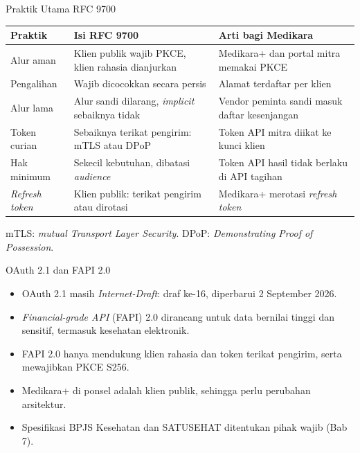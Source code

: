 \documentclass[aspectratio=169, table, 12pt]{beamer}
\begin{document}
\begin{frame}{{\Large Praktik Utama RFC 9700}}
  \footnotesize
  \begin{tabularx}{\textwidth}{>{\raggedright\arraybackslash}p{2.4cm}
      >{\raggedright\arraybackslash}X >{\raggedright\arraybackslash}X}
    \hline
    \textbf{Praktik} & \textbf{Isi RFC 9700} & \textbf{Arti bagi Medikara} \\ \hline
    Alur aman & Klien publik wajib PKCE, klien rahasia dianjurkan & Medikara+ dan portal mitra memakai PKCE \\ \hline
    Pengalihan & Wajib dicocokkan secara persis & Alamat terdaftar per klien \\ \hline
    Alur lama & Alur sandi dilarang, \textit{implicit} sebaiknya tidak & Vendor peminta sandi masuk daftar kesenjangan \\ \hline
    Token curian & Sebaiknya terikat pengirim: mTLS atau DPoP & Token API mitra diikat ke kunci klien \\ \hline
    Hak minimum & Sekecil kebutuhan, dibatasi \textit{audience} & Token API hasil tidak berlaku di API tagihan \\ \hline
    \textit{Refresh token} & Klien publik: terikat pengirim atau dirotasi & Medikara+ merotasi \textit{refresh token} \\ \hline
  \end{tabularx}

  \vspace{4pt}
  mTLS: \textit{mutual Transport Layer Security}. DPoP: \textit{Demonstrating Proof of Possession}.
\end{frame}

\begin{frame}{{\Large OAuth 2.1 dan FAPI 2.0}}
  \vspace{10pt}
  \begin{itemize}
    \item OAuth 2.1 masih \textit{Internet-Draft}: draf ke-16, diperbarui 2 September 2026.
    \item \textit{Financial-grade API} (FAPI) 2.0 dirancang untuk data bernilai tinggi dan sensitif, termasuk kesehatan elektronik.
    \item FAPI 2.0 hanya mendukung klien rahasia dan token terikat pengirim, serta mewajibkan PKCE S256.
    \item Medikara+ di ponsel adalah klien publik, sehingga perlu perubahan arsitektur.
    \item Spesifikasi BPJS Kesehatan dan SATUSEHAT ditentukan pihak wajib (Bab 7).
  \end{itemize}
\end{frame}
\end{document}
